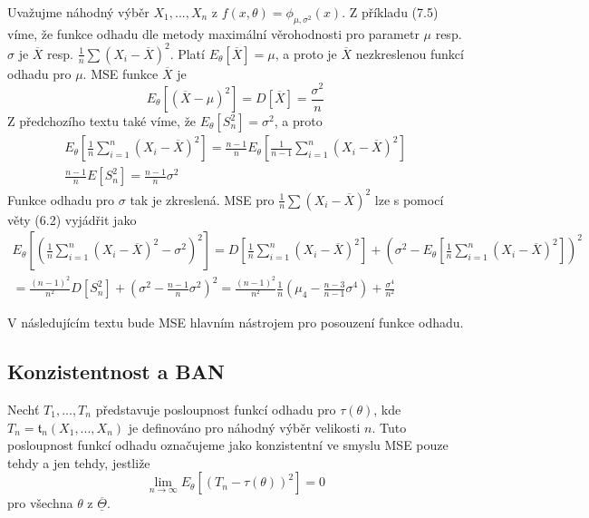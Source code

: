 \begin{example}
Uvažujme náhodný výběr $X_1, ..., X_n$ z $f(x, \theta) = \phi_{\mu, \sigma^2}(x)$. Z příkladu (7.5) víme, že funkce odhadu dle metody maximální věrohodnosti pro parametr $\mu$ resp. $\sigma$ je $\overline{X}$ resp. $\frac{1}{n}\sum (X_i - \overline{X})^2$. Platí $E_{\theta}[\overline{X}] = \mu$, a proto je $\overline{X}$ nezkreslenou funkcí odhadu pro $\mu$. MSE funkce $\overline{X}$ je
\begin{equation*}
E_{\theta}[(\overline{X} - \mu)^2] = D[\overline{X}] = \frac{\sigma^2}{n}
\end{equation*}
Z předchozího textu také víme, že $E_{\theta}[S_n^2] = \sigma^2$, a proto
\begin{gather*}
E_{\theta}\left[\frac{1}{n} \sum_{i = 1}^n (X_i - \overline{X})^2 \right] = \frac{n - 1}{n}E_{\theta}\left[\frac{1}{n - 1} \sum_{i = 1}^n (X_i - \overline{X})^2 \right]\\
\frac{n - 1}{n}E[S_n^2] = \frac{n - 1}{n} \sigma^2
\end{gather*}
Funkce odhadu pro $\sigma$ tak je zkreslená. MSE pro $\frac{1}{n} \sum (X_i - \overline{X})^2$ lze s pomocí věty (6.2) vyjádřit jako
\begin{gather*}
E_{\theta}\left[\left(\frac{1}{n} \sum_{i = 1}^n (X_i - \overline{X})^2 - \sigma^2 \right)^2 \right] = D\left[\frac{1}{n} \sum_{i = 1}^n (X_i - \overline{X})^2 \right] + \left(\sigma^2 - E_{\theta}\left[\frac{1}{n} \sum_{i = 1}^n (X_i - \overline{X})^2 \right] \right)^2\\
= \frac{(n - 1)^2}{n^2}D[S_n^2] + \left(\sigma^2 - \frac{n - 1}{n} \sigma^2 \right)^2 = \frac{(n - 1)^2}{n^2}\frac{1}{n}\left(\mu_4 - \frac{n - 3}{n - 1}\sigma^4 \right) + \frac{\sigma^4}{n^2}
\end{gather*}
\end{example}

V následujícím textu bude MSE hlavním nástrojem pro posouzení funkce odhadu.

\subsection{Konzistentnost a BAN}

\begin{definition}
Nechť $T_1, ..., T_n$ představuje posloupnost funkcí odhadu pro $\tau(\theta)$, kde $T_n = \mathfrak{t}_n(X_1, ..., X_n)$ je definováno pro náhodný výběr velikosti $n$. Tuto posloupnost funkcí odhadu označujeme jako konzistentní ve smyslu MSE pouze tehdy a jen tehdy, jestliže
\begin{equation*}
\lim_{n \rightarrow \infty} E_{\theta}[(T_n - \tau(\theta))^2] = 0
\end{equation*}
pro všechna $\theta$ z $\overline{\underline{\Theta}}$.
\end{definition}

